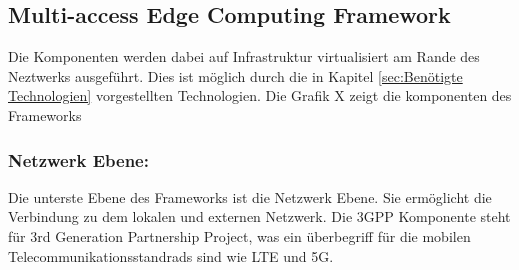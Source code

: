 \documentclass[runningheads]{llncs}
\numberwithin{figure}{section}
\begin{document}
\subsection{Multi-access Edge Computing Framework}
Die Komponenten werden dabei auf Infrastruktur virtualisiert am Rande des Neztwerks ausgeführt. 
Dies ist möglich durch die in Kapitel \ref{sec:Benötigte Technologien} vorgestellten Technologien.
Die Grafik X zeigt die komponenten des Frameworks

\subsubsection{Netzwerk Ebene:}
Die unterste Ebene des Frameworks ist die Netzwerk Ebene. Sie ermöglicht die Verbindung zu dem lokalen und 
externen Netzwerk. Die 3GPP Komponente steht für 3rd Generation Partnership Project, was ein überbegriff für die mobilen
Telecommunikationsstandrads sind wie LTE und 5G. 
\end{document}
